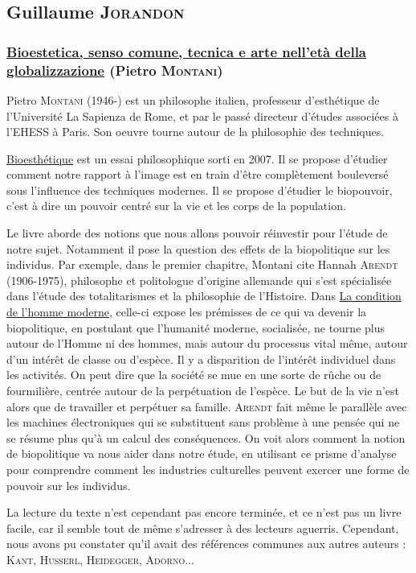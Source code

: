\documentclass[a4paper,10pt]{article}
\begin{document}
\subsection{Guillaume \textsc{Jorandon}}

\subsubsection{\underline{Bioestetica, senso comune, tecnica e arte nell'età della globalizzazione} (Pietro \textsc{Montani})}

Pietro \textsc{Montani} (1946-) est un philosophe italien, professeur d'esthétique de l'Université La Sapienza de Rome, et par le passé directeur d'études associées à l'EHESS à Paris. Son oeuvre tourne autour de la philosophie des techniques.

\underline{Bioesthétique} est un essai philosophique sorti en 2007. Il se propose d'étudier comment notre rapport à l'image est en train d'être complètement bouleversé sous l'influence des techniques modernes. Il se propose d'étudier le biopouvoir, c'est à dire un pouvoir centré sur la vie et les corps de la population.

Le livre aborde des notions que nous allons pouvoir réinvestir pour l'étude de notre sujet. Notamment il pose la question des effets de la biopolitique sur les individus. Par exemple, dans le premier chapitre, Montani cite Hannah \textsc{Arendt} (1906-1975), philosophe et politologue d'origine allemande qui s'est spécialisée dans l'étude des totalitarismes et la philosophie de l'Histoire. Dans \underline{La condition de l'homme moderne}, celle-ci expose les prémisses de ce qui va devenir la biopolitique, en postulant que l'humanité moderne, socialisée, ne tourne plus autour de l'Homme ni des hommes, mais autour du processus vital même, autour d'un intérêt de classe ou d'espèce. Il y a disparition de l'intérêt individuel dans les activités. On peut dire que la société se mue en une sorte de rûche ou de fourmilière, centrée autour de la perpétuation de l'espèce. Le but de la vie n'est alors que de travailler et perpétuer sa famille. \textsc{Arendt} fait même le parallèle avec les machines électroniques qui se substituent sans problème à une pensée qui ne se résume plus qu'à un calcul des conséquences. On voit alors comment  la notion de biopolitique va nous aider dans notre étude, en utilisant ce prisme d'analyse pour comprendre comment les industries culturelles peuvent exercer une forme de pouvoir sur les individus.

La lecture du texte n'est cependant pas encore terminée, et ce n'est pas un livre facile, car il semble tout de même s'adresser à des lecteurs aguerris. Cependant, nous avons pu constater qu'il avait des références communes aux autres auteurs : \textsc{Kant}, \textsc{Husserl}, \textsc{Heidegger}, \textsc{Adorno}...
\end{document}
